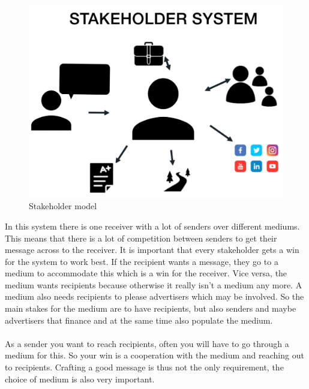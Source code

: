 \documentclass[../summary.tex]{subfiles}
\begin{document}
			\begin{figure}[h]
				\centering
				\includegraphics[width=0.7\linewidth]{../images/12-stakeholder-model.png}
				\caption{Stakeholder model}
				\label{fig:12-stakeholder-model}
			\end{figure}
			\newpage
			In this system there is one receiver with a lot of senders over different mediums. This means that there is a lot of competition between senders to get their message across to the receiver. It is important that every stakeholder gets a win for the system to work best. If the recipient wants a message, they go to a medium to accommodate this which is a win for the receiver. Vice versa, the medium wants recipients because otherwise it really isn't a medium any more. A medium also needs recipients to please advertisers which may be involved.  So the main stakes for the medium are to have recipients, but also senders and maybe advertisers that finance and at the same time also populate the medium.\\
			\\
			As a sender you want to reach recipients, often you will have to go through a medium for this. So your win is a cooperation with the medium and reaching out to recipients. Crafting a good message is thus not the only requirement, the choice of medium is also very important. 
			
\end{document}
